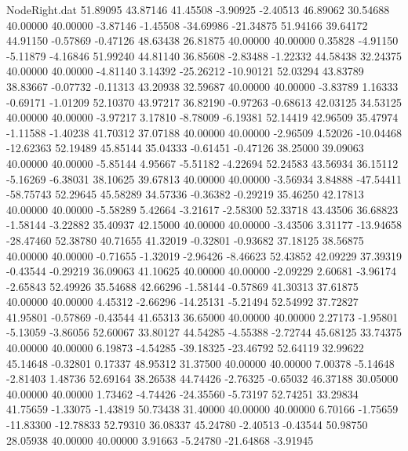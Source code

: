 \begin{filecontents}{NodeRight.dat}
  51.89095   43.87146   41.45508    -3.90925   -2.40513   46.89062   30.54688   40.00000   40.00000   -3.87146   -1.45508  -34.69986  -21.34875
  51.94166   39.64172   44.91150    -0.57869   -0.47126   48.63438   26.81875   40.00000   40.00000    0.35828   -4.91150   -5.11879   -4.16846
  51.99240   44.81140   36.85608    -2.83488   -1.22332   44.58438   32.24375   40.00000   40.00000   -4.81140    3.14392  -25.26212  -10.90121
  52.03294   43.83789   38.83667    -0.07732   -0.11313   43.20938   32.59687   40.00000   40.00000   -3.83789    1.16333   -0.69171   -1.01209
  52.10370   43.97217   36.82190    -0.97263   -0.68613   42.03125   34.53125   40.00000   40.00000   -3.97217    3.17810   -8.78009   -6.19381
  52.14419   42.96509   35.47974    -1.11588   -1.40238   41.70312   37.07188   40.00000   40.00000   -2.96509    4.52026  -10.04468  -12.62363
  52.19489   45.85144   35.04333    -0.61451   -0.47126   38.25000   39.09063   40.00000   40.00000   -5.85144    4.95667   -5.51182   -4.22694
  52.24583   43.56934   36.15112    -5.16269   -6.38031   38.10625   39.67813   40.00000   40.00000   -3.56934    3.84888  -47.54411  -58.75743
  52.29645   45.58289   34.57336    -0.36382   -0.29219   35.46250   42.17813   40.00000   40.00000   -5.58289    5.42664   -3.21617   -2.58300
  52.33718   43.43506   36.68823    -1.58144   -3.22882   35.40937   42.15000   40.00000   40.00000   -3.43506    3.31177  -13.94658  -28.47460
  52.38780   40.71655   41.32019    -0.32801   -0.93682   37.18125   38.56875   40.00000   40.00000   -0.71655   -1.32019   -2.96426   -8.46623
  52.43852   42.09229   37.39319    -0.43544   -0.29219   36.09063   41.10625   40.00000   40.00000   -2.09229    2.60681   -3.96174   -2.65843
  52.49926   35.54688   42.66296    -1.58144   -0.57869   41.30313   37.61875   40.00000   40.00000    4.45312   -2.66296  -14.25131   -5.21494
  52.54992   37.72827   41.95801    -0.57869   -0.43544   41.65313   36.65000   40.00000   40.00000    2.27173   -1.95801   -5.13059   -3.86056
  52.60067   33.80127   44.54285    -4.55388   -2.72744   45.68125   33.74375   40.00000   40.00000    6.19873   -4.54285  -39.18325  -23.46792
  52.64119   32.99622   45.14648    -0.32801    0.17337   48.95312   31.37500   40.00000   40.00000    7.00378   -5.14648   -2.81403    1.48736
  52.69164   38.26538   44.74426    -2.76325   -0.65032   46.37188   30.05000   40.00000   40.00000    1.73462   -4.74426  -24.35560   -5.73197
  52.74251   33.29834   41.75659    -1.33075   -1.43819   50.73438   31.40000   40.00000   40.00000    6.70166   -1.75659  -11.83300  -12.78833
  52.79310   36.08337   45.24780    -2.40513   -0.43544   50.98750   28.05938   40.00000   40.00000    3.91663   -5.24780  -21.64868   -3.91945

\end{filecontents}
